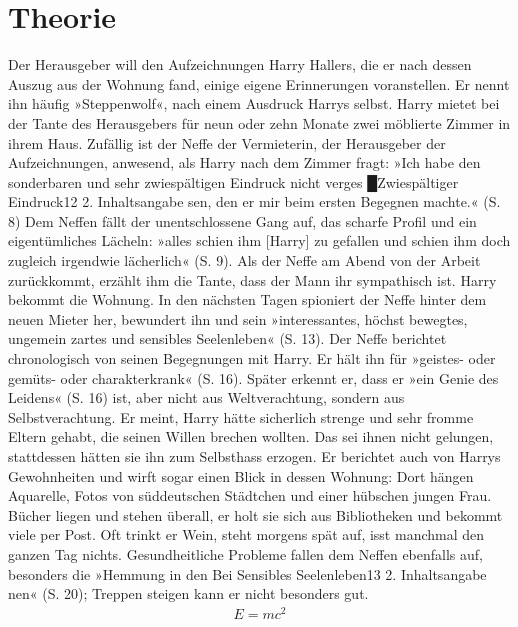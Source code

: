 \documentclass[a4paper,10pt,twocolumn]{article}
\begin{document}
\section{Theorie}
    Der Herausgeber will den Aufzeichnungen Harry Hallers, die er nach dessen Auszug aus der Wohnung fand, einige eigene Erinnerungen voranstellen. Er nennt ihn häufig »Steppenwolf«, nach einem Ausdruck Harrys selbst. Harry mietet bei der Tante des Herausgebers für neun oder zehn Monate zwei möblierte Zimmer in ihrem Haus. Zufällig ist der Neffe der Vermieterin, der Herausgeber der Aufzeichnungen, anwesend, als Harry nach dem Zimmer fragt: »Ich habe den sonderbaren und sehr zwiespältigen Eindruck nicht verges █Zwiespältiger Eindruck12 2. Inhaltsangabe sen, den er mir beim ersten Begegnen machte.« (S. 8) Dem Neffen fällt der unentschlossene Gang auf, das scharfe Profil und ein eigentümliches Lächeln: »alles schien ihm [Harry] zu gefallen und schien ihm doch zugleich irgendwie lächerlich« (S. 9). Als der Neffe am Abend von der Arbeit zurückkommt, erzählt ihm die Tante, dass der Mann ihr sympathisch ist. Harry bekommt die Wohnung. 
    In den nächsten Tagen spioniert der Neffe hinter dem neuen Mieter her, bewundert ihn und sein »interessantes, höchst bewegtes, ungemein zartes und sensibles Seelenleben« (S. 13). Der Neffe berichtet chronologisch von seinen Begegnungen mit Harry. Er hält ihn für »geistes- oder gemüts- oder charakterkrank« (S. 16). Später erkennt er, dass er »ein Genie des Leidens« (S. 16) ist, aber nicht aus Weltverachtung, sondern aus Selbstverachtung. Er meint, Harry hätte sicherlich strenge und sehr fromme Eltern gehabt, die seinen Willen brechen wollten. Das sei ihnen nicht gelungen, stattdessen hätten sie ihn zum Selbsthass erzogen. Er berichtet auch von Harrys Gewohnheiten und wirft sogar einen Blick in dessen Wohnung: Dort hängen Aquarelle, Fotos von süddeutschen Städtchen und einer hübschen jungen Frau. Bücher liegen und stehen überall, er holt sie sich aus Bibliotheken und bekommt viele per Post. Oft trinkt er Wein, steht morgens spät auf, isst manchmal den ganzen Tag nichts. Gesundheitliche Probleme fallen dem Neffen ebenfalls auf, besonders die »Hemmung in den Bei Sensibles Seelenleben13 2. Inhaltsangabe nen« (S. 20); Treppen steigen kann er nicht besonders gut.
\begin{align}
    E=mc^2
\end{align}
\end{document}
